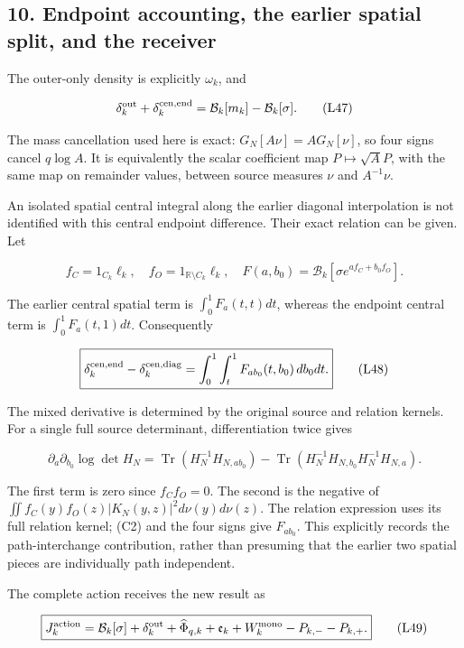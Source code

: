 \subsection{10. Endpoint accounting, the earlier spatial split, and the receiver}\label{endpoint-accounting-the-earlier-spatial-split-and-the-receiver}

The outer-only density is explicitly \(\omega_k\), and

\[
\delta_k^{\rm out}+\delta_k^{\rm cen,end}
=\mathcal B_k[m_k]-\mathcal B_k[\sigma].
\tag{L47}
\]

The mass cancellation used here is exact: \(G_N[A\nu]=A G_N[\nu]\), so four signs cancel \(q\log A\). It is equivalently the scalar coefficient map \(P\mapsto\sqrt A P\), with the same map on remainder values, between source measures \(\nu\) and \(A^{-1}\nu\).

An isolated spatial central integral along the earlier diagonal interpolation is not identified with this central endpoint difference. Their exact relation can be given. Let

\[
f_C=1_{C_k}\ell_k,\quad f_O=1_{\mathbb R\setminus C_k}\ell_k,
\quad F(a,b_0)=\mathcal B_k[\sigma e^{af_C+b_0f_O}].
\]

The earlier central spatial term is \(\int_0^1F_a(t,t)dt\), whereas the endpoint central term is \(\int_0^1F_a(t,1)dt\). Consequently

\[
\boxed{\delta_k^{\rm cen,end}-\delta_k^{\rm cen,diag}
=\int_0^1\int_t^1F_{ab_0}(t,b_0)\,db_0dt.}
\tag{L48}
\]

The mixed derivative is determined by the original source and relation kernels. For a single full source determinant, differentiation twice gives

\[
\partial_a\partial_{b_0}\log\det H_N
=\operatorname{Tr}(H_N^{-1}H_{N,ab_0})
-\operatorname{Tr}(H_N^{-1}H_{N,b_0}H_N^{-1}H_{N,a}).
\]

The first term is zero since \(f_Cf_O=0\). The second is the negative of
\(\iint f_C(y)f_O(z)|K_N(y,z)|^2d\nu(y)d\nu(z)\).
The relation expression uses its full relation kernel; (C2) and the four signs give \(F_{ab_0}\). This explicitly records the path-interchange contribution, rather than presuming that the earlier two spatial pieces are individually path independent.

The complete action receives the new result as

\[
\boxed{J_k^{\rm action}=\mathcal B_k[\sigma]
+\delta_k^{\rm out}+\widehat\Phi_{q,k}
+\mathfrak e_k+W_k^{\rm mono}-P_{k,-}-P_{k,+}.}
\tag{L49}
\]

